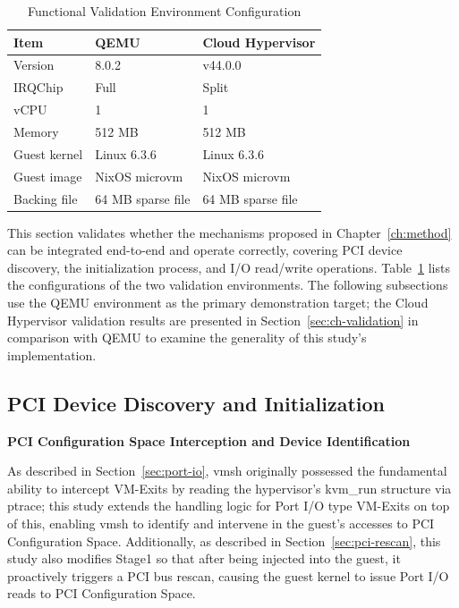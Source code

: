 \begin{ZhChapter}
\begin{table}[htbp]
    \centering
    \caption{Functional Validation Environment Configuration}
    \label{tab:func-test-env}
    \renewcommand\arraystretch{1.5}{
        \begin{tabular}{| l | l | l |}
        \hline
        Item & QEMU & Cloud Hypervisor \\
        \hline
        Version & 8.0.2 & v44.0.0 \\
        \hline
        IRQChip & Full & Split \\
        \hline
        vCPU & 1 & 1 \\
        \hline
        Memory & 512 MB & 512 MB \\
        \hline
        Guest kernel & Linux 6.3.6 & Linux 6.3.6 \\
        \hline
        Guest image & NixOS microvm & NixOS microvm \\
        \hline
        Backing file & 64 MB sparse file & 64 MB sparse file \\
        \hline
        \end{tabular}
    }
\end{table}

This section validates whether the mechanisms proposed in Chapter~\ref{ch:method} can be integrated end-to-end and operate correctly, covering PCI device discovery, the initialization process, and I/O read/write operations. Table~\ref{tab:func-test-env} lists the configurations of the two validation environments. The following subsections use the QEMU environment as the primary demonstration target; the Cloud Hypervisor validation results are presented in Section~\ref{sec:ch-validation} in comparison with QEMU to examine the generality of this study's implementation.

\subsection{PCI Device Discovery and Initialization}
\label{sec:pci-discovery}

\noindent\textbf{PCI Configuration Space Interception and Device Identification}

As described in Section~\ref{sec:port-io}, vmsh originally possessed the fundamental ability to intercept VM-Exits by reading the hypervisor's kvm\_run structure via ptrace; this study extends the handling logic for Port I/O type VM-Exits on top of this, enabling vmsh to identify and intervene in the guest's accesses to PCI Configuration Space. Additionally, as described in Section~\ref{sec:pci-rescan}, this study also modifies Stage1 so that after being injected into the guest, it proactively triggers a PCI bus rescan, causing the guest kernel to issue Port I/O reads to PCI Configuration Space.


\end{ZhChapter}

